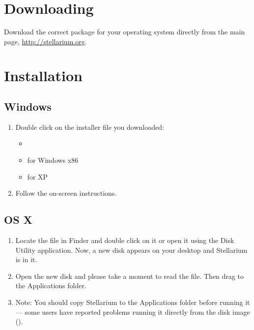 \section{Downloading}
\label{sec:GettingStarted:Downloading}

Download the correct package for your operating system directly from the main page,
\url{http://stellarium.org}.

\section{Installation}
\label{sec:GettingStarted:Installation}

\subsection{Windows}

\begin{enumerate}
\item Double click on the installer file you downloaded:
\begin{itemize}
\item {}
\item {} for Windows x86
\item {} for XP
\end{itemize}
\item Follow the on-screen instructions.
\end{enumerate}

\subsection{OS X}

\begin{enumerate}
\item
  Locate the  file in
  Finder and double click on it or open it using the Disk Utility
  application. Now, a new disk appears on your desktop and Stellarium is
  in it.
\item
  Open the new disk and please take a moment to read the  file.
  Then drag  to the Applications folder.
\item
  Note: You should copy Stellarium to the Applications folder before
  running it --- some users have reported problems running it directly
  from the disk image ().
\end{enumerate}

